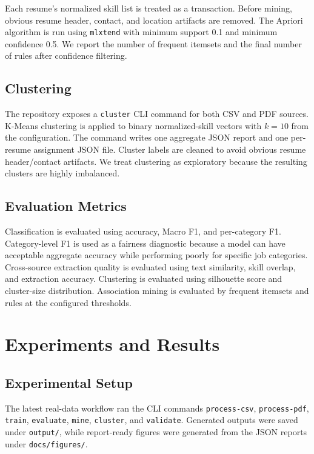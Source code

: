 \documentclass[sigconf, authorversion, nonacm]{acmart}
\begin{document}
Each resume's normalized skill list is treated as a transaction. Before mining, obvious resume header, contact, and location artifacts are removed. The Apriori algorithm is run using \texttt{mlxtend} with minimum support 0.1 and minimum confidence 0.5. We report the number of frequent itemsets and the final number of rules after confidence filtering.

\subsection{Clustering}

The repository exposes a \texttt{cluster} CLI command for both CSV and PDF sources. K-Means clustering is applied to binary normalized-skill vectors with $k=10$ from the configuration. The command writes one aggregate JSON report and one per-resume assignment JSON file. Cluster labels are cleaned to avoid obvious resume header/contact artifacts. We treat clustering as exploratory because the resulting clusters are highly imbalanced.

\subsection{Evaluation Metrics}

Classification is evaluated using accuracy, Macro F1, and per-category F1. Category-level F1 is used as a fairness diagnostic because a model can have acceptable aggregate accuracy while performing poorly for specific job categories. Cross-source extraction quality is evaluated using text similarity, skill overlap, and extraction accuracy. Clustering is evaluated using silhouette score and cluster-size distribution. Association mining is evaluated by frequent itemsets and rules at the configured thresholds.

\section{Experiments and Results}
\label{sec:experiments-results}

\subsection{Experimental Setup}

The latest real-data workflow ran the CLI commands \texttt{process-csv}, \texttt{process-pdf}, \texttt{train}, \texttt{evaluate}, \texttt{mine}, \texttt{cluster}, and \texttt{validate}. Generated outputs were saved under \texttt{output/}, while report-ready figures were generated from the JSON reports under \texttt{docs/figures/}.
\end{document}
